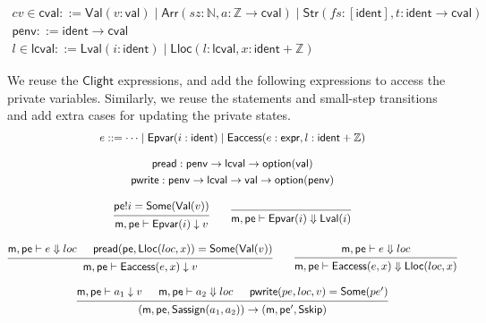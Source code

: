 \documentclass[acmsmall,screen,review,anonymous]{acmart}
\newcommand{\kw}[1]{\ensuremath{ \mathsf{#1} }}
\begin{document}
\begin{gather*}
  cv \in \kw{cval} \mathrel{::=} \kw{Val}(v:\kw{val})
                     \mathrel{|} \kw{Arr}(sz:\mathbb{N},a:\mathbb{Z} \rightarrow \kw{cval})
                     \mathrel{|} \kw{Str}(fs:[\kw{ident}],t:\kw{ident} \rightarrow \kw{cval})
  \\
  \kw{penv} \mathrel{::=} \kw{ident} \rightarrow \kw{cval}
  \\
  l \in \kw{lcval} \mathrel{::=} \kw{Lval}(i: \kw{ident})
                          \mathrel{|} \kw{Lloc}(l:\kw{lcval}, x:\kw{ident}+\mathbb{Z})
\end{gather*}

We reuse the $\kw{Clight}$ expressions,
and add the following expressions to access the private variables.
Similarly, we reuse the statements and small-step transitions
and add extra cases for updating the private states.
\begin{gather*}
  e \mathrel{::=} \cdots \mathrel{|} \kw{Epvar}(i:\kw{ident})
  \mathrel{|} \kw{Eaccess}(e:\kw{expr}, l:\kw{ident}+\mathbb{Z})
  \\[2ex]
  \kw{pread} \mathrel{:} \kw{penv} \rightarrow \kw{lcval} \rightarrow \kw{option}(\kw{val})\\
  \kw{pwrite} \mathrel{:} \kw{penv} \rightarrow \kw{lcval} \rightarrow \kw{val} \rightarrow \kw{option}(\kw{penv})
  \\[2ex]
  {\begin{prooftree}
    \hypo{\kw{pe}!i = \kw{Some}(\kw{Val}(v))}
    \infer1{\kw{m},\kw{pe} \vdash \kw{Epvar}(i) \downarrow v}
  \end{prooftree}}
  \qquad
  {\begin{prooftree}
    \infer0{\kw{m},\kw{pe} \vdash \kw{Epvar}(i) \Downarrow \kw{Lval}(i)}
  \end{prooftree}}
  \\[2ex]
  {\begin{prooftree}
    \hypo{\kw{m}, \kw{pe} \vdash e \Downarrow loc}
    \hypo{\kw{pread}(\kw{pe}, \kw{Lloc}(loc, x)) = \kw{Some}(\kw{Val}(v))}
    \infer2{\kw{m},\kw{pe} \vdash \kw{Eaccess}(e, x) \downarrow v}
  \end{prooftree}}
  \qquad
  {\begin{prooftree}
    \hypo{\kw{m},\kw{pe} \vdash e \Downarrow loc}
    \infer1{\kw{m}, \kw{pe} \vdash \kw{Eaccess}(e, x) \Downarrow \kw{Lloc}(loc, x)}
  \end{prooftree}}
  \\[2ex]
  {\begin{prooftree}
    \hypo{\kw{m}, \kw{pe} \vdash a_1 \downarrow v}
    \hypo{\kw{m}, \kw{pe} \vdash a_2 \Downarrow loc}
    \hypo{\kw{pwrite}(pe, loc, v) = \kw{Some}(pe')}
    \infer3{(\kw{m}, \kw{pe}, \kw{Sassign}(a_1, a_2)) \rightarrow
      (\kw{m}, \kw{pe'}, \kw{Sskip})}
  \end{prooftree}}
\end{gather*}
\end{document}
